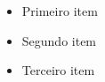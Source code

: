 \documentclass{article}
\begin{document}
\begin{itemize}
  \item Primeiro item
  \item Segundo item
  \item Terceiro item
\end{itemize}
\end{document}
